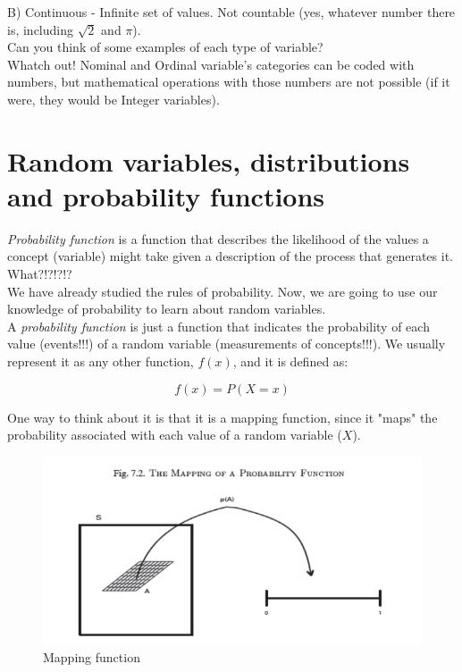 \documentclass[11pt]{article}
\begin{document}
	B) Continuous - Infinite set of values. Not countable (yes, whatever number there is, including $\sqrt{2} $ and $\pi$). \\

	Can you think of some examples of each type of variable?\\

	Whatch out! Nominal and Ordinal variable's categories can be coded with numbers, but mathematical operations with those numbers are not possible (if it were, they would be Integer variables).

\section*{Random variables, distributions and probability functions}

	\emph{Probability function} is a function that describes the likelihood of the values a concept (variable) might take given a description of the process that generates it.\\
	
	What?!?!?!?\\

	We have already studied the rules of probability. Now, we are going to use our knowledge of probability to learn about random variables.\\
	
	A \emph{probability function} is just a function that indicates the probability of each value (events!!!) of a random variable (measurements of concepts!!!). We usually represent it as any other function, $f(x)$, and it is defined as:
	
	\[f(x) = P(X=x)\]
	
	One way to think about it is that it is a mapping function, since it "maps" the probability associated with each value of a random variable ($X$).\\	

\begin{figure}[htp]
\centering
\includegraphics[scale=0.70]{mapping.png}
\caption{Mapping function}
\label{}
\end{figure}	
\end{document}
